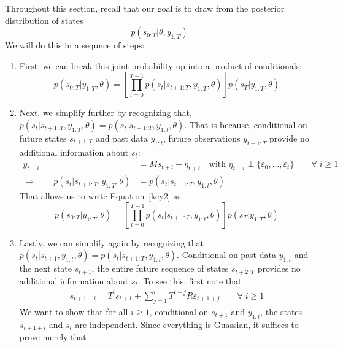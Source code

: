 \documentclass[a4paper,12pt]{article}
\begin{document}
Throughout this section, recall that our goal is to draw from the
posterior distribution of states
\begin{equation}
  p(s_{0:T}|\theta, y_{1:T})
\end{equation}
We will do this in a sequnce of steps:
\begin{enumerate}
  \item First, we can break this joint probability up into a product of
    conditionals:
    \begin{equation}
      \label{key2}
      p(s_{0:T}|y_{1:T},\theta) =
      \left[ \prod_{t=0}^{T-1} p(s_t|s_{t+1:T},y_{1:T},\theta) \right]
      p(s_T|y_{1:T},\theta)
    \end{equation}
  \item Next, we simplify further by recognizing that,
    $p(s_t|s_{t+1:T},y_{1:T},\theta) = p(s_t|s_{t+1:T},y_{1:t},\theta)$.
    That is because, conditional on future states $s_{t+1:T}$ and past
    data $y_{1:t}$, future observations $y_{t+1:T}$ provide no
    additional information about $s_t$:
    \begin{align*}
      y_{t+i} &= M s_{t+i} + \eta_{t+i}
      \quad \text{with } \eta_{t+i} \perp \{\varepsilon_0, \ldots,
      \varepsilon_t\} \qquad \forall \; i \geq 1 \\
      \Rightarrow\qquad
      p(s_t|s_{t+1:T},y_{1:T},\theta)
      &= p(s_t|s_{t+1:T},y_{1:t},\theta)
    \end{align*}
    That allows us to write Equation~\ref{key2} as
    \begin{equation}
      p(s_{0:T}|y_{1:T},\theta) =
      \left[ \prod_{t=0}^{T-1} p(s_t|s_{t+1:T},y_{1:t},\theta) \right]
      p(s_T|y_{1:T},\theta)
    \end{equation}
  \item Lastly, we can simplify again by recognizing that
    $p(s_t|s_{t+1}, y_{1:t},\theta) = p(s_t|s_{t+1:T},y_{1:t},\theta)$.
    Conditional on past data $y_{1:t}$ and the next state $s_{t+1}$, the
    entire future sequence of states $s_{t+2:T}$ provides no additional
    information about $s_t$.  To see this, first note that
    \begin{align}
      s_{t+1+i} = T^i s_{t+1} + \sum^i_{j=1} T^{i-j} R \varepsilon_{t+1+j}
      \qquad \forall \; i \geq 1
      \label{st1i}
    \end{align}
    We want to show that for all $i\geq1$, conditional on $s_{t+1}$ and
    $y_{1:t}$, the states $s_{t+1+i}$ and $s_t$ are independent.  Since
    everything is Guassian, it suffices to prove merely that

\end{enumerate}
\end{document}
